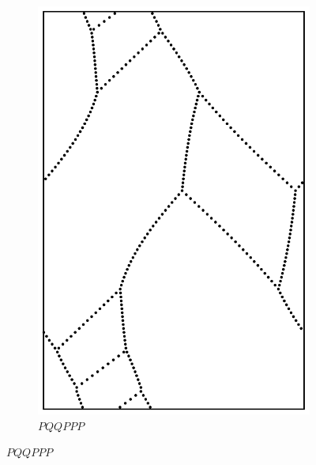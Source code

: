 \documentclass[12pt,twoside]{reedthesis}
\theoremstyle{definition}
\begin{document}
\begin{figure}[h]
\begin{subfigure}[t]{0.24\textwidth}
    \includegraphics[width=\textwidth]{figures/string_cheese_appendix/pqqppp.pdf}
    \caption*{$PQQPPP$}
    \vspace{5mm}
  \end{subfigure}
\end{figure}
\end{document}
